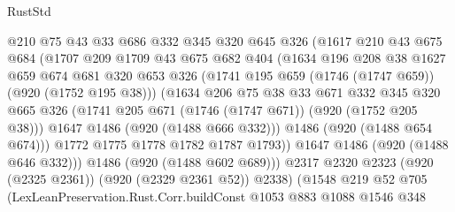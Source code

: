\begin{lexlean}{RustStd}
\begin{coremodule}
                      @210
                      @75
                      @43
                      @33
                      @686
                      @332
                      @345
                      @320
                      @645
                      @326
                      (@1617
                        @210
                        @43
                        @675
                        @684
                        (@1707
                          @209
                          @1709
                          @43
                          @675
                          @682
                          @404
                          (@1634
                            @196
                            @208
                            @38
                            @1627
                            @659
                            @674
                            @681
                            @320
                            @653
                            @326
                            (@1741 @195 @659 (@1746 (@1747 @659)) (@920 (@1752 @195 @38)))
                            (@1634
                              @206
                              @75
                              @38
                              @33
                              @671
                              @332
                              @345
                              @320
                              @665
                              @326
                              (@1741 @205 @671 (@1746 (@1747 @671)) (@920 (@1752 @205 @38)))
                              @1647
                              @1486
                              (@920 (@1488 @666 @332)))
                            @1486
                            (@920 (@1488 @654 @674)))
                          @1772
                          @1775
                          @1778
                          @1782
                          @1787
                          @1793))
                      @1647
                      @1486
                      (@920 (@1488 @646 @332)))
                    @1486
                    (@920 (@1488 @602 @689)))
                  @2317
                  @2320
                  @2323
                  (@920 (@2325 @2361))
                  (@920 (@2329 @2361 @52))
                  @2338)
                (@1548
                  @219
                  @52
                  @705
                  (LexLeanPreservation.Rust.Corr.buildConst
                    @1053
                    @883
                    @1088
                    @1546
                    @348

\end{coremodule}
\end{lexlean}
